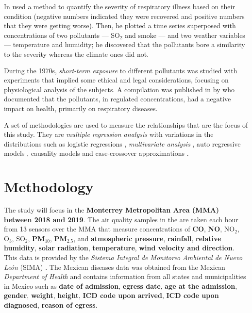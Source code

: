 \documentclass[
  11pt,
  a4paper,
  oneside
]{article}
\begin{document}
In \citeyear{Lawther1959} \citeauthor{Lawther1959} used a method to quantify the severity of respiratory illness based on their condition (negative numbers indicated they were recovered and positive numbers that they were getting worse). Then, he plotted a time series superposed with concentrations of two pollutants --- SO$_2$ and smoke --- and two weather variables --- temperature and humidity; he discovered that the pollutants bore a similarity to the severity whereas the climate ones did not.

During the 1970s, {\em short-term exposure} to different pollutants was studied \citep{HackneyEA1975, EhrlichEA1977, HackneyEA1978, LinnEA1978} with experiments that implied some ethical and legal considerations,  focusing on physiological analysis of the subjects. A compilation was published in by \citeauthor{Ferris1978} who documented that the pollutants, in regulated concentrations, had a negative impact on health, primarily on respiratory diseases.

A set of methodologies are used to measure the relationships that are the focus of this study. They are \emph{multiple regression analysis} \citep{Hyndman2018, Lebowitz1973, hasselblad1978, hatzakisEA1986} with variations in the distributions such as logistic regressions \citep{Korn1979}, \emph{multivariate analysis} \citep{LaveEA1973, gottinger1983}, auto regressive models \citep{WeiEA1991}, causality models \citep{popescuEA2013} and case-crossover approximations \citep{Maclure1991, carracedoMartinezEA2009}.

\section{Methodology}
The study will focus in the \textbf{Monterrey Metropolitan Area (MMA) between 2018 and 2019}. The air quality samples in the are taken each hour from 13 sensors over the MMA that measure concentrations of \textbf{CO}, \textbf{NO}, \textbf{$\text{NO}_2$}, \textbf{$\text{O}_3$}, \textbf{$\text{SO}_2$}, \textbf{PM$_{10}$}, \textbf{PM$_{2.5}$}, and \textbf{atmospheric pressure}, \textbf{rainfall}, \textbf{relative humidity}, \textbf{solar radiation}, \textbf{temperature}, \textbf{wind velocity and direction}. This data is provided by the \textit{Sistema Integral de Monitoreo Ambiental de Nuevo León} (SIMA) \citep{aireNL}. The Mexican diseases data was obtained from the Mexican \textit{Department of Health} \citep{egresos} and contains information from all states and municipalities in Mexico such as \textbf{date of admission}, \textbf{egress date}, \textbf{age at the admission}, \textbf{gender}, \textbf{weight}, \textbf{height}, \textbf{ICD code upon arrived}, \textbf{ICD code upon diagnosed}, \textbf{reason of egress}.
\end{document}
